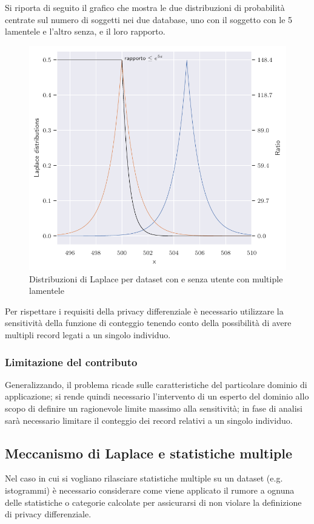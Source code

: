 Si riporta di seguito il grafico che mostra le due distribuzioni di probabilità centrate sul numero di soggetti nei due database, uno con il soggetto con le 5 lamentele e l'altro senza, e il loro rapporto.
\begin{figure}[H]
    \centering
    \includegraphics[scale=0.7]{plots/double_laplace_pdf.pdf}
    \caption{Distribuzioni di Laplace per dataset con e senza utente con multiple lamentele}
\end{figure}

Per rispettare i requisiti della privacy differenziale è necessario utilizzare la sensitività della funzione di conteggio tenendo conto della possibilità di avere multipli record legati a un singolo individuo.

\subsubsection{Limitazione del contributo}
\label{sec:contribution_lim}
Generalizzando, il problema ricade sulle caratteristiche del particolare dominio di applicazione; si rende quindi necessario l'intervento di un esperto del dominio allo scopo di definire un ragionevole limite massimo alla sensitività; in fase di analisi sarà necessario limitare il conteggio dei record relativi a un singolo individuo.

\subsection{Meccanismo di Laplace e statistiche multiple}
Nel caso in cui si vogliano rilasciare statistiche multiple su un dataset (e.g. istogrammi) è necessario considerare come viene applicato il rumore a ognuna delle statistiche o categorie calcolate per assicurarsi di non violare la definizione di privacy differenziale.

